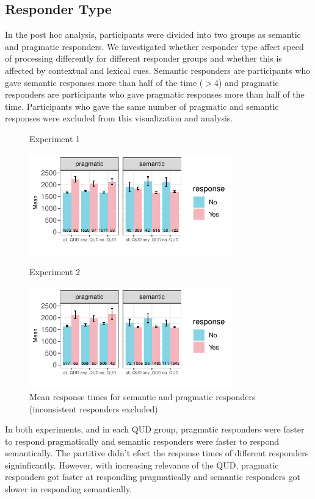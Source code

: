 \documentclass[12pt]{article}
\begin{document}
\subsection*{Responder Type}
In the post hoc analysis, participants were divided into two groups as semantic and pragmatic responders. We investigated whether responder type affect speed of processing differently for different responder groups and whether this is affected by contextual and lexical cues. Semantic responders are participants who gave semantic responses more than half of the time ($>$4) and pragmatic responders are participants who gave pragmatic responses more than half of the time. Participants who gave the same number of pragmatic and semantic responses were excluded from this visualization and analysis. 

\begin{figure}[!ht] 
    \begin{minipage}{.5\textwidth}
        \caption*{Experiment 1}
        \includegraphics[height=4.4cm]{img/exp4_responder.pdf}
    \end{minipage}%
    \begin{minipage}{.5\textwidth}
        \caption*{Experiment 2}
        \includegraphics[height=4.4cm]{img/exp5_responder.pdf}
    \end{minipage}%
    \caption{Mean response times for semantic and pragmatic responders (inconsistent responders excluded)}
\end{figure}

In both experiments, and in each QUD group, pragmatic responders were faster to respond pragmatically and semantic responders were faster to respond semantically. The partitive didn't efect the response times of different responders signinficantly. However, with increasing relevance of the QUD, pragmatic responders got faster at responding pragmatically and semantic responders got slower in responding semantically.
\end{document}
